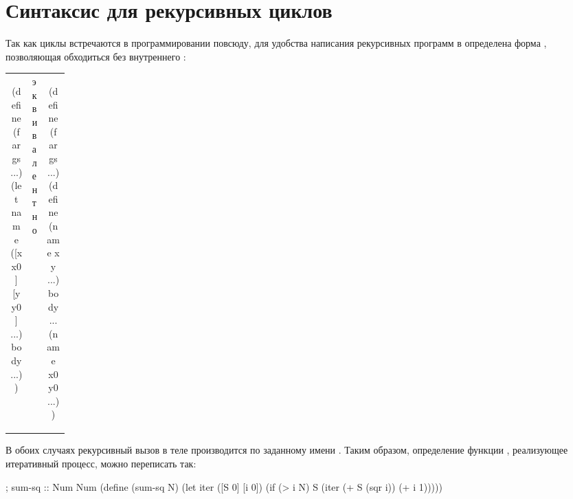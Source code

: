 \section[3]{Синтаксис для рекурсивных циклов}\label{named-let}%
Так как циклы встречаются в программировании повсюду, для удобства написания рекурсивных программ в \Scheme определена форма , позволяющая обходиться без внутреннего :

\begin{tabular}{cp{0.1\linewidth}c}
  \begin{minipage}{0.35\linewidth}
\begin{SchemeCode}[emph={name,x,y,x0,y0}]
(define (f args ...)
  (let name ([x x0] 
             [y y0] ...)
    body ...))
\end{SchemeCode}    
  \end{minipage} & эквива\-лентно &
  \begin{minipage}{0.35\linewidth}
\begin{SchemeCode}[emph={name,x,y,x0,y0}]
(define (f args ...)
  (define (name x y ...)
    body ...
  (name x0 y0 ...))
\end{SchemeCode}    
  \end{minipage}
\end{tabular}

В обоих случаях рекурсивный вызов в теле  производится по заданному имени .
Таким образом, определение функции , реализующее итеративный процесс, можно переписать так:
\begin{Definition}[emph={N,S,i}]
; sum-sq :: Num \arrow Num
(define (sum-sq N)
  (let iter ([S 0] [i 0])
    (if (> i N)
        S
        (iter (+ S (sqr i)) (+ i 1)))))
\end{Definition}

